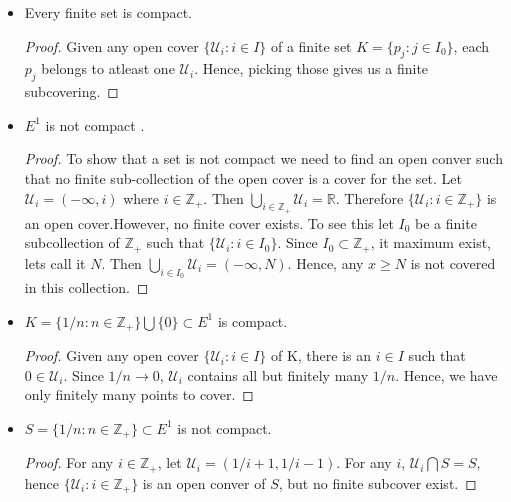 \begin{itemize}
    \item Every finite set is compact.
	\begin{proof}
	    Given any open cover $\left.\lbrace \mathcal{U}_i : i \in I \rbrace\right.$ of a finite
	    set $K = \left.\lbrace p_j : j \in I_0\rbrace\right.$, each $p_j$ belongs to atleast one
	    $\mathcal{U}_i$. Hence, picking those gives us a finite subcovering.
	\end{proof}
    \item $E^1$ is not compact .
	\begin{proof}
	    To show that a set is not compact we need to find an open conver such that no finite
	    sub-collection of the open cover is a cover for the set. Let $\mathcal{U}_i =
	    \left(-\infty, i\right)$ where $i \in \mathbb{Z}_+$.  Then $\bigcup_{i \in \mathbb{Z}_+}\mathcal{U}_i = \mathbb{R}$.
	     Therefore $\left.\lbrace \mathcal{U}_i : i \in \mathbb{Z}_+ \rbrace\right.$ is an open
	    cover.However, no finite cover exists. To see this let $I_0$ be a finite subcollection 
	    of $\mathbb{Z}_+$ such that $\left.\lbrace \mathcal{U}_i : i \in I_0 \rbrace\right.$. 
	    Since $I_0 \subset \mathbb{Z}_+$, it maximum exist, lets call it $N$. Then $
	    \bigcup_{i \in I_0}\mathcal{U}_i = \left(-\infty,N\right)$. Hence, any $x \geq N$ is not
	    covered in this collection.
	\end{proof}
    \item $K = \left.\lbrace 1/n : n \in \mathbb{Z}_+\rbrace\right. \bigcup \left.\lbrace 0
	    \rbrace\right. \subset E^1$ is compact.  
	\begin{proof}
	    Given any open cover $\left.\lbrace \mathcal{U}_i : i \in I \rbrace\right.$ of K, there
	    is an $i \in I$ such that $0 \in \mathcal{U}_i$. Since $1/n \rightarrow 0$,
	$\mathcal{U}_i$ contains all but finitely many $1/n$. Hence, we have only finitely many
	points to cover.
	\end{proof}

    \item $S = \left.\lbrace 1/n : n \in \mathbb{Z}_+\rbrace\right. \subset E^1$ is not compact.
	\begin{proof}
	    For any $i \in \mathbb{Z}_+$, let $\mathcal{U}_i = \left(1/i+1 , 1/i-1\right)$. For any
	    $i$, $\mathcal{U}_i \bigcap S = S$, hence $\left.\lbrace \mathcal{U}_i : i \in
		\mathbb{Z}_+ \rbrace\right.$ is an open conver of $S$, but no finite subcover exist.
	\end{proof}

\end{itemize}
